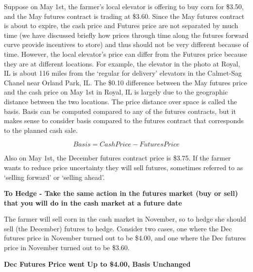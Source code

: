 \documentclass[
  letterpaper,
  DIV=11,
  numbers=noendperiod]{scrreprt}
\begin{document}
Suppose on May 1st, the farmer's local elevator is offering to buy corn
for \$3.50, and the May futures contract is trading at \$3.60. Since the
May futures contract is about to expire, the cash price and Futures
price are not separated by much time (we have discussed briefly how
prices through time along the futures forward curve provide incentives
to store) and thus should not be very different because of time.
However, the local elevator's price can differ from the Futures price
because they are at different locations. For example, the elevator in
the photo at Royal, IL is about 116 miles from the `regular for
delivery' elevators in the Calmet-Sag Chanel near Orland Park, IL. The
\$0.10 difference between the May futures price and the cash price on
May 1st in Royal, IL is largely due to the geographic distance between
the two locations. The price distance over space is called the basis.
Basis can be computed compared to any of the futures contracts, but it
makes sense to consider basis compared to the futures contract that
corresponds to the planned cash sale.

\[Basis = Cash Price - Futures Price\]

Also on May 1st, the December futures contract price is \$3.75. If the
farmer wants to reduce price uncertainty they will sell futures,
sometimes referred to as `selling forward' or `selling ahead'.

\textbf{To Hedge - Take the same action in the futures market (buy or
sell) that you will do in the cash market at a future date}

The farmer will sell corn in the cash market in November, so to hedge
she should sell (the December) futures to hedge. Consider two cases, one
where the Dec futures price in November turned out to be \$4.00, and one
where the Dec futures price in November turned out to be \$3.60.

\textbf{Dec Futures Price went Up to \$4.00, Basis Unchanged}
\end{document}
